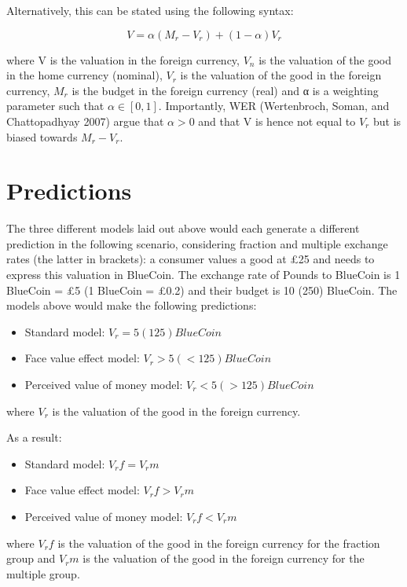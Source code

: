 \documentclass[
]{report}
\providecommand{\tightlist}{%
  \setlength{\itemsep}{0pt}\setlength{\parskip}{0pt}}\usepackage{longtable,booktabs,array}
\begin{document}
Alternatively, this can be stated using the following syntax:

\[V = α(M_r - V_r) + (1 - α)V_r\]

where V is the valuation in the foreign currency, \(V_n\) is the
valuation of the good in the home currency (nominal), \(V_r\) is the
valuation of the good in the foreign currency, \(M_r\) is the budget in
the foreign currency (real) and α is a weighting parameter such that
\(α ∈[0,1]\). Importantly, WER (Wertenbroch, Soman, and Chattopadhyay
2007) argue that \(α > 0\) and that V is hence not equal to \(V_r\) but
is biased towards \(M_r - V_r\).

\section{Predictions}\label{predictions}

The three different models laid out above would each generate a
different prediction in the following scenario, considering fraction and
multiple exchange rates (the latter in brackets): a consumer values a
good at £25 and needs to express this valuation in BlueCoin. The
exchange rate of Pounds to BlueCoin is 1 BlueCoin = £5 (1 BlueCoin =
£0.2) and their budget is 10 (250) BlueCoin. The models above would make
the following predictions:

\begin{itemize}
\tightlist
\item
  Standard model: \(V_r = 5 (125) BlueCoin\)
\item
  Face value effect model: \(V_r > 5 (< 125) BlueCoin\)
\item
  Perceived value of money model: \(V_r < 5 (> 125) BlueCoin\)
\end{itemize}

where \(V_r\) is the valuation of the good in the foreign currency.

As a result:

\begin{itemize}
\tightlist
\item
  Standard model: \(V_rf = V_rm\)
\item
  Face value effect model: \(V_rf > V_rm\)
\item
  Perceived value of money model: \(V_rf < V_rm\)
\end{itemize}

where \(V_rf\) is the valuation of the good in the foreign currency for
the fraction group and \(V_rm\) is the valuation of the good in the
foreign currency for the multiple group.
\end{document}
